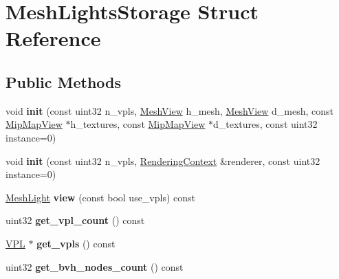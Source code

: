 \hypertarget{struct_mesh_lights_storage}{}\section{Mesh\+Lights\+Storage Struct Reference}
\label{struct_mesh_lights_storage}
\subsection*{Public Methods}
\begin{DoxyCompactItemize}
\item 
\mbox{\label{struct_mesh_lights_storage_aaec6b459bcf803ff3dae265fbc19d456}} 
void {\bfseries init} (const uint32 n\+\_\+vpls, \hyperlink{struct_mesh_view}{Mesh\+View} h\+\_\+mesh, \hyperlink{struct_mesh_view}{Mesh\+View} d\+\_\+mesh, const \hyperlink{struct_mip_map_view}{Mip\+Map\+View} $\ast$h\+\_\+textures, const \hyperlink{struct_mip_map_view}{Mip\+Map\+View} $\ast$d\+\_\+textures, const uint32 instance=0)
\item 
\mbox{\label{struct_mesh_lights_storage_a427a93efcf010a15f99db96ab93bccff}} 
void {\bfseries init} (const uint32 n\+\_\+vpls, \hyperlink{struct_rendering_context}{Rendering\+Context} \&renderer, const uint32 instance=0)
\item 
\mbox{\label{struct_mesh_lights_storage_a40f3ed9e7d55a59271f4cda195cd42e7}} 
\hyperlink{struct_mesh_light}{Mesh\+Light} {\bfseries view} (const bool use\+\_\+vpls) const
\item 
\mbox{\label{struct_mesh_lights_storage_ac72c3a7fffab3958354779c627304d35}} 
uint32 {\bfseries get\+\_\+vpl\+\_\+count} () const
\item 
\mbox{\label{struct_mesh_lights_storage_ae125253f1b7db4ba14a4795b22702a43}} 
\hyperlink{struct_v_p_l}{V\+PL} $\ast$ {\bfseries get\+\_\+vpls} () const
\item 
\mbox{\label{struct_mesh_lights_storage_aec36f95aec1e31ffc2f61b272e92dcc7}} 
uint32 {\bfseries get\+\_\+bvh\+\_\+nodes\+\_\+count} () const
\item 
\mbox{\label{struct_mesh_lights_storage_a6728c5f9edfc2f6b7ac41899f8d978e0}} 

\end{DoxyCompactItemize}
